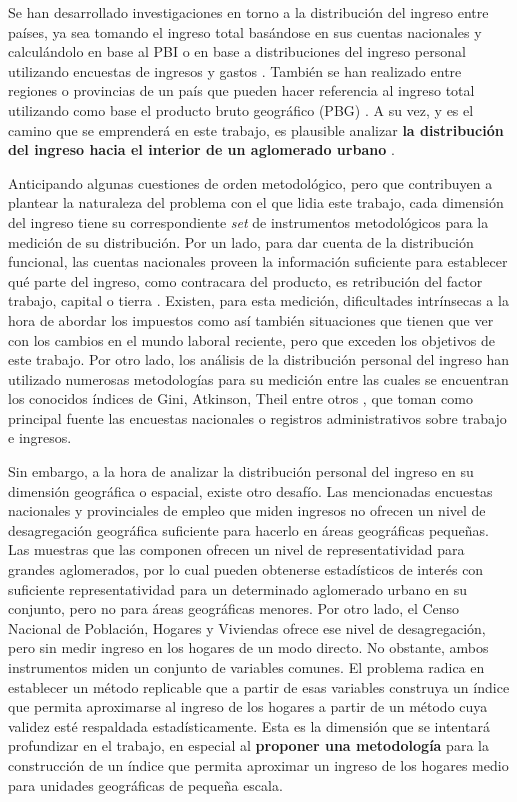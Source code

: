 Se han desarrollado investigaciones en torno a la distribución del ingreso entre países, ya sea tomando el ingreso total basándose en sus cuentas nacionales y calculándolo en base al PBI \cite{theil} o en base a distribuciones del ingreso personal utilizando encuestas de ingresos y gastos \cite{milanovic2002,milanovic2005,davies}. También se han realizado entre regiones o provincias de un país \cite{artana} que pueden hacer referencia al ingreso total utilizando como base el producto bruto geográfico (PBG) \cite{altimir1975}. A su vez, y es el camino que se emprenderá en este trabajo, es plausible analizar \textbf{la distribución del ingreso hacia el interior de un aglomerado urbano} \cite{gasparini2000,giayetto}. 

Anticipando algunas cuestiones de orden metodológico, pero que contribuyen a plantear la naturaleza del problema con el que lidia este trabajo, cada dimensión del ingreso tiene su correspondiente \textit{set} de instrumentos metodológicos para la medición de su distribución. Por un lado, para dar cuenta de la distribución funcional, las cuentas nacionales proveen la información suficiente para establecer qué parte del ingreso, como contracara del producto, es retribución del factor trabajo, capital o tierra \cite{grania}. Existen, para esta medición, dificultades intrínsecas a la hora de abordar los impuestos como así también situaciones que tienen que ver con los cambios en el mundo laboral reciente, pero que exceden los objetivos de este trabajo. Por otro lado, los análisis de la distribución personal del ingreso han utilizado numerosas metodologías para su medición entre las cuales se encuentran los conocidos índices de Gini, Atkinson, Theil entre otros \cite{worldbank}, que toman como principal fuente las encuestas nacionales o registros administrativos sobre trabajo e ingresos.

Sin embargo,  a la hora de analizar la distribución personal del ingreso en su dimensión geográfica o espacial, existe otro desafío. Las mencionadas encuestas nacionales y provinciales de empleo que miden ingresos no ofrecen un nivel de desagregación geográfica suficiente para hacerlo en áreas geográficas pequeñas. Las muestras que las componen ofrecen un nivel de representatividad para grandes aglomerados, por lo cual pueden obtenerse estadísticos de interés con suficiente representatividad para un determinado aglomerado urbano en su conjunto, pero no para áreas geográficas menores. Por otro lado, el Censo Nacional de Población, Hogares y Viviendas ofrece ese nivel de desagregación, pero sin medir ingreso en los hogares de un modo directo. No obstante, ambos instrumentos miden un conjunto de variables comunes. El problema radica en establecer un método replicable que a partir de esas variables construya un índice que permita aproximarse al ingreso de los hogares a partir de un método cuya validez esté respaldada estadísticamente. Esta es la dimensión que se intentará profundizar en el trabajo, en especial al \textbf{proponer una metodología } para la construcción de un índice que permita aproximar un ingreso de los hogares medio para unidades geográficas de pequeña escala.


